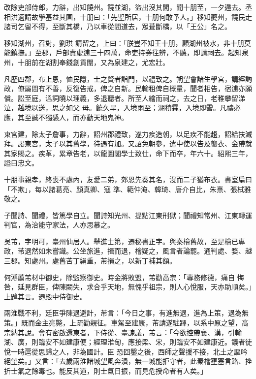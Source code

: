 \begin{pinyinscope}
 改除吏部侍郎，力辭，出知饒州。饒並湖，盜出沒其間，聞十朋至，一夕遁去。丞相洪適請故學基益其圃，十朋曰：「先聖所居，十朋何敢予人。」移知夔州，饒民走諸司乞留不得，至斷其橋，乃以車從間道去，眾葺斷橋，以「王公」名之。



 移知湖州，召對，劉珙
 請留之，上曰：「朕豈不知王十朋，顧湖州被水，非十朋莫能鎮撫。」至郡，戶部責虛逋三十四萬，命吏持券往辨，不聽，即請祠去。起知泉州，十朋前在湖割奉錢創貢闈，又為泉建之，尤宏壯。



 凡歷四郡，布上恩，恤民隱，士之賢者詣門，以禮致之。朔望會諸生學宮，講經詢政，僚屬間有不善，反復告戒，俾之自新。民輸租俾自概量，聞者相告，宿逋亦願償。訟至庭，溫詞曉以理義，多退聽者。所至人繪而祠之，去之日，老稚攀留涕泣，越境以送，思之如父
 母。饒久旱，入境雨至；湖積霖，入境即霽。凡禱必應，其至誠不獨感人，而亦動天地鬼神。



 東宮建，除太子詹事，力辭，詔州郡禮致，遂力疾造朝，以足疾不能趨，詔給扶減拜。謁東宮，太子以其舊學，待遇有加。又詔免朝參，遣中使以告及襲衣、金帶就其家賜之。疾革，累章告老，以龍圖閣學士致仕，命下而卒，年六十。紹熙三年，謚曰忠文。



 十朋事親孝，終喪不處內，友愛二弟，郊恩先奏其名，沒而二子猶布衣。書室扁曰「不欺」，每以諸葛亮、顏真卿、寇
 準、範仲淹、韓琦、唐介自比，朱熹、張栻雅敬之。



 子聞詩、聞禮，皆篤學自立。聞詩知光州、提點江東刑獄；聞禮知常州、江東轉運判官，為治能守家法，人亦思慕之。



 吳芾，字明可，臺州仙居人。舉進士第，遷秘書正字。與秦檜舊故，至是檜已專政，芾退然如未嘗識。公坐旅進，揖而退，檜疑之，風言者論罷。通判處、婺、越三郡。知處州。處舊苦丁絹重，芾損之，以新丁補其額。



 何溥薦芾材中御史，除監察御史。時金將敗盟，芾勸高宗：「專務修德，痛自
 悔咎，延見群臣，俾陳闕失，求合乎天地，無愧乎祖宗，則人心悅服，天亦助順矣。」上韙其言。遷殿中侍御史。



 兩淮戰不利，廷臣爭陳退避計，芾言：「今日之事，有進無退，進為上策，退為無策。」既而金主亮斃，上疏勸親征。車駕至建康，芾請遂駐蹕，以系中原之望，高宗納其說。會有密啟還東者，下侍從、臺諫議，芾言：「今欲控帶襄、漢，引輸湖、廣，則臨安不如建康便；經理淮甸，應接梁、宋，則臨安不如建康近。議者徒悅一時扈從思歸之人，非為國計。臣
 恐回鑿之後，西師之聲援不接，北土之謳吟絕望矣。」又言：「去歲兩淮諸城望風奔潰，無一城能拒守者，此秦檜壅塞言路、挫折士氣之餘毒也。能反其道，則士氣日振，而見危授命者有人矣。」




\end{pinyinscope}
